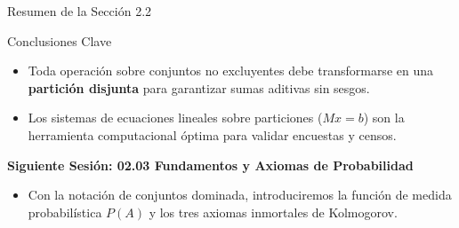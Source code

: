 \begin{frame}{Resumen de la Sección 2.2}
  \begin{block}{Conclusiones Clave}
    \begin{itemize}
      \item Toda operación sobre conjuntos no excluyentes debe transformarse en una \textbf{partición disjunta} para garantizar sumas aditivas sin sesgos. \pause
      \item Los sistemas de ecuaciones lineales sobre particiones ($Mx = b$) son la herramienta computacional óptima para validar encuestas y censos.
    \end{itemize}
  \end{block}
  
  \vspace{0.6em}
  \pause
  {\large \color{TecAzulOscuro}\textbf{Siguiente Sesión: 02.03 Fundamentos y Axiomas de Probabilidad}}
  \vspace{0.3em}
  \begin{itemize}
    \item Con la notación de conjuntos dominada, introduciremos la función de medida probabilística $P(A)$ y los tres axiomas inmortales de Kolmogorov.
  \end{itemize}
\end{frame}


